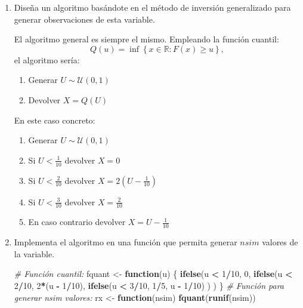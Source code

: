 \documentclass[
]{book}
\newenvironment{Shaded}{\begin{snugshade}}{\end{snugshade}}
\newcommand{\CommentTok}[1]{\textcolor[rgb]{0.56,0.35,0.01}{\textit{#1}}}
\newcommand{\ControlFlowTok}[1]{\textcolor[rgb]{0.13,0.29,0.53}{\textbf{#1}}}
\newcommand{\DecValTok}[1]{\textcolor[rgb]{0.00,0.00,0.81}{#1}}
\newcommand{\KeywordTok}[1]{\textcolor[rgb]{0.13,0.29,0.53}{\textbf{#1}}}
\newcommand{\NormalTok}[1]{#1}
\newcommand{\OperatorTok}[1]{\textcolor[rgb]{0.81,0.36,0.00}{\textbf{#1}}}
\newcommand{\StringTok}[1]{\textcolor[rgb]{0.31,0.60,0.02}{#1}}
\theoremstyle{break}
\theoremstyle{definition}
\theoremstyle{definition}
\theoremstyle{definition}
\theoremstyle{remark}
\begin{document}
\begin{enumerate}
\def\labelenumi{\alph{enumi})}
\item
  Diseña un algoritmo basándote en el método de inversión generalizado
  para generar observaciones de esta variable.

  El algoritmo general es siempre el mismo. Empleando la función cuantil:
  \[Q\left( u\right) = \inf \left\{ x\in \mathbb{R}:F\left( x\right) 
  \geq u\right\},\]
  el algoritmo sería:

  \begin{enumerate}
  \def\labelenumii{\arabic{enumii}.}
  \item
    Generar \(U\sim \mathcal{U}\left( 0,1\right)\)
  \item
    Devolver \(X=Q\left( U\right)\)
  \end{enumerate}

  En este caso concreto:

  \begin{enumerate}
  \def\labelenumii{\arabic{enumii}.}
  \item
    Generar \(U\sim \mathcal{U}\left( 0,1\right)\)
  \item
    Si \(U < \frac{1}{10}\) devolver \(X = 0\)
  \item
    Si \(U < \frac{2}{10}\) devolver \(X = 2(U - \frac{1}{10})\)
  \item
    Si \(U < \frac{3}{10}\) devolver \(X = \frac{2}{10}\)
  \item
    En caso contrario devolver \(X = U - \frac{1}{10}\)
  \end{enumerate}
\item
  Implementa el algoritmo en una función que permita generar \(nsim\)
  valores de la variable.

\begin{Shaded}
\begin{Highlighting}[]
\CommentTok{# Función cuantil:}
\NormalTok{fquant <-}\StringTok{ }\ControlFlowTok{function}\NormalTok{(u) \{}
\KeywordTok{ifelse}\NormalTok{(u }\OperatorTok{<}\StringTok{ }\DecValTok{1}\OperatorTok{/}\DecValTok{10}\NormalTok{, }\DecValTok{0}\NormalTok{,}
     \KeywordTok{ifelse}\NormalTok{(u }\OperatorTok{<}\StringTok{ }\DecValTok{2}\OperatorTok{/}\DecValTok{10}\NormalTok{, }\DecValTok{2}\OperatorTok{*}\NormalTok{(u }\OperatorTok{-}\StringTok{ }\DecValTok{1}\OperatorTok{/}\DecValTok{10}\NormalTok{),}
            \KeywordTok{ifelse}\NormalTok{(u }\OperatorTok{<}\StringTok{ }\DecValTok{3}\OperatorTok{/}\DecValTok{10}\NormalTok{, }\DecValTok{1}\OperatorTok{/}\DecValTok{5}\NormalTok{, u }\OperatorTok{-}\StringTok{ }\DecValTok{1}\OperatorTok{/}\DecValTok{10}\NormalTok{) ) )}
\NormalTok{\}}
\CommentTok{# Función para generar nsim valores:}
\NormalTok{rx <-}\StringTok{ }\ControlFlowTok{function}\NormalTok{(nsim) }\KeywordTok{fquant}\NormalTok{(}\KeywordTok{runif}\NormalTok{(nsim))}
\end{Highlighting}
\end{Shaded}


\end{enumerate}
\end{document}
